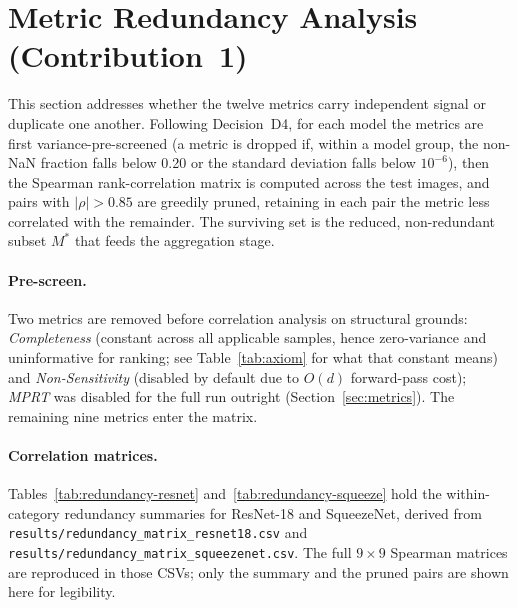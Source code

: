\section{Metric Redundancy Analysis (Contribution~1)}
\label{sec:exp-redundancy}

This section addresses whether the twelve metrics carry independent signal or
duplicate one another. Following Decision~D4, for each model the metrics are
first variance-pre-screened (a metric is dropped if, within a model group, the
non-NaN fraction falls below 0.20 or the standard deviation falls below
$10^{-6}$), then the Spearman rank-correlation matrix is computed across the
test images, and pairs with $|\rho| > 0.85$ are greedily pruned, retaining in
each pair the metric less correlated with the remainder. The surviving set is
the reduced, non-redundant subset $M^{*}$ that feeds the aggregation stage.

\paragraph{Pre-screen.}
Two metrics are removed before correlation analysis on structural grounds:
\emph{Completeness} (constant across all applicable samples, hence
zero-variance and uninformative for ranking; see Table~\ref{tab:axiom} for
what that constant means) and \emph{Non-Sensitivity}
(disabled by default due to $O(d)$ forward-pass cost); \emph{MPRT} was
disabled for the full run outright (Section~\ref{sec:metrics}). The
remaining nine
metrics enter the matrix.

\paragraph{Correlation matrices.}
Tables~\ref{tab:redundancy-resnet} and~\ref{tab:redundancy-squeeze} hold the
within-category redundancy summaries for ResNet-18 and SqueezeNet, derived from
\texttt{results/redundancy\_matrix\_resnet18.csv} and
\texttt{results/redundancy\_matrix\_squeezenet.csv}. The full $9 \times 9$
Spearman matrices are reproduced in those CSVs; only the summary and the pruned
pairs are shown here for legibility.





